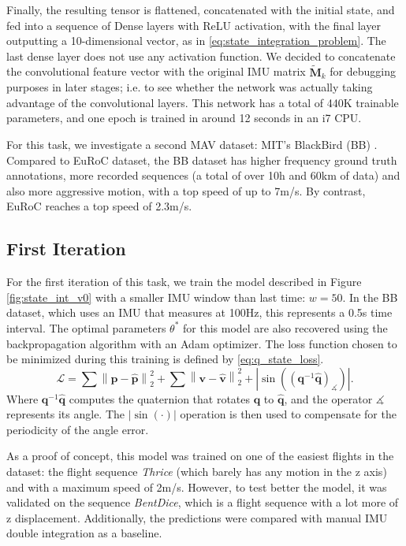 Finally, the resulting tensor is flattened, concatenated with the initial state, and fed into a sequence of Dense layers with ReLU activation, with the final layer outputting a 10-dimensional vector, as in \ref{eq:state_integration_problem}.
The last dense layer does not use any activation function. 
We decided to concatenate the convolutional feature vector with the original IMU matrix $\mathbf{\tilde{M}}_k$ for debugging purposes in later stages; i.e. to see whether the network was actually taking advantage of the convolutional layers.
This network has a total of 440K trainable parameters, and one epoch is trained in around 12 seconds in an i7 CPU. 

For this task, we investigate a second MAV dataset: MIT's BlackBird (BB) \cite{antonini2018blackbird}.
Compared to EuRoC dataset, the BB dataset has higher frequency ground truth annotations, more recorded sequences (a total of over 10h and 60km of data) and also more aggressive motion, with a top speed of up to 7m/s. 
By contrast, EuRoC reaches a top speed of 2.3m/s.

\subsection{First Iteration}
For the first iteration of this task, we train the model described in Figure \ref{fig:state_int_v0} with a smaller IMU window than last time: $w=50$. 
In the BB dataset, which uses an IMU that measures at 100Hz, this represents a 0.5s time interval.
The optimal parameters $\theta^*$ for this model are also recovered using the backpropagation algorithm with an Adam optimizer. 
The loss function chosen to be minimized during this training is defined by \ref{eq:q_state_loss}.
\begin{equation}\label{eq:q_state_loss}
    \mathcal{L}= \sum{\left \|\mathbf{p}-\mathbf{\hat{p}}  \right \|_2^2} + \sum{\left\|\mathbf{v}-\mathbf{\hat{v}}  \right \|_2^2} + \left |\sin\left(\left(\mathbf{q}^{-1}\mathbf{\hat{q}}\right)_\measuredangle \right)  \right |.
\end{equation}
Where $\mathbf{q}^{-1}\mathbf{\hat{q}}$ computes the quaternion that rotates $\mathbf{q}$ to $\mathbf{\hat{q}}$, and the operator $\measuredangle$ represents its angle.
The $|\sin(\cdot)|$ operation is then used to compensate for the periodicity of the angle error.

As a proof of concept, this model was trained on one of the easiest flights in the dataset: the flight sequence \emph{Thrice} (which barely has any motion in the z axis) and with a maximum speed of 2m/s.
However, to test better the model, it was validated on the sequence \emph{BentDice}, which is a flight sequence with a lot more of z displacement. 
Additionally, the predictions were compared with manual IMU double integration as a baseline.

